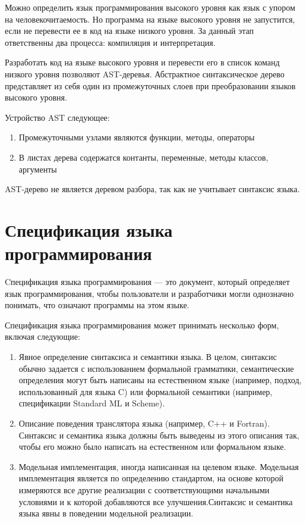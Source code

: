 \documentclass{mipt-thesis-bs}
\begin{document}
Можно определить язык программирования высокого уровня как язык с упором на человекочитаемость. Но
программа на языке высокого уровня не запустится, если не перевести ее в код на языке низкого уровня. За
данный этап ответственны два процесса: компиляция и интерпретация.

Разработать код на языке высокого уровня и перевести его в список команд низкого уровня позволяют AST-деревья.
Абстрактное синтаксическое дерево представляет из себя один из промежуточных слоев при преобразовании языков
высокого уровня.

Устройство AST следующее:

\begin{enumerate}
    \item Промежуточными узлами являются функции, методы, операторы
    \item В листах дерева содержатся контанты, переменные, методы классов, аргументы
\end{enumerate}

AST-дерево не является деревом разбора, так как не учитывает синтаксис языка.

\section{Спецификация языка программирования}

Cпецификация языка программирования — это документ, который определяет язык программирования, 
чтобы пользователи и разработчики могли однозначно понимать, что означают программы на этом языке.

Спецификация языка программирования может принимать несколько форм, включая следующие:

\begin{enumerate}
    \item Явное определение синтаксиса и семантики языка. В целом, синтаксис обычно 
    задается с использованием формальной грамматики, семантические определения 
    могут быть написаны на естественном языке (например, подход, использованный 
    для языка C) или формальной семантики (например, спецификации Standard ML и Scheme).
    \item Описание поведения транслятора языка (например, C++ и Fortran). 
    Синтаксис и семантика языка должны быть выведены из этого описания так, 
    чтобы его можно было написать на естественном или формальном языке.
    \item Модельная имплементация, иногда написанная на целевом языке. Модельная имплементация
    является по определению стандартом, на основе которой измеряются все другие реализации с 
    соответствующими начальными условиями и к которой добавляются все улучшения.Синтаксис 
    и семантика языка явны в поведении модельной реализации. 
\end{enumerate}
\end{document}
